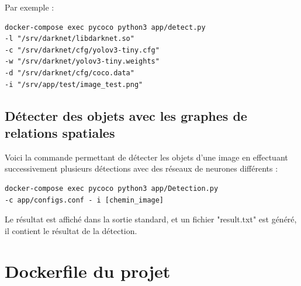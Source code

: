 \documentclass[debug,nodate,hideweeklyreports]{polytech/polytech}
\begin{document}
Par exemple :

\begin{lstlisting}
docker-compose exec pycoco python3 app/detect.py 
-l "/srv/darknet/libdarknet.so" 
-c "/srv/darknet/cfg/yolov3-tiny.cfg" 
-w "/srv/darknet/yolov3-tiny.weights" 
-d "/srv/darknet/cfg/coco.data" 
-i "/srv/app/test/image_test.png"
\end{lstlisting}

\section{Détecter des objets avec les graphes de relations spatiales}

Voici la commande permettant de détecter les objets d'une image en effectuant successivement plusieurs détections avec des réseaux de neurones différents :

\begin{lstlisting}
docker-compose exec pycoco python3 app/Detection.py  
-c app/configs.conf - i [chemin_image]
\end{lstlisting}

Le résultat est affiché dans la sortie standard, et un fichier "result.txt" est généré, il contient le résultat de la détection.


\chapter{Dockerfile du projet}
\label{ann:dockerfile}
\end{document}
